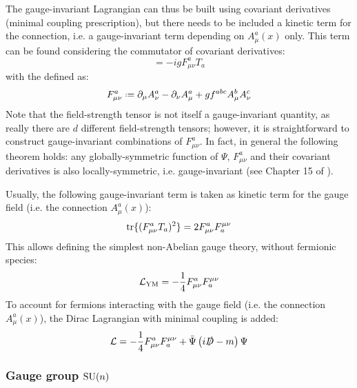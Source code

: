 The gauge-invariant Lagrangian can thus be built using covariant derivatives (minimal coupling prescription), but there needs to be included a kinetic term for the connection, i.e. a gauge-invariant term depending on $ A_\mu^a(x) $ only. This term can be found considering the commutator of covariant derivatives:
\begin{equation}
  [D_\mu , D_\nu] = - i g F_{\mu \nu}^a T_a
\end{equation}
with the  defined as:
\begin{equation}
  F_{\mu \nu}^a \defeq \pa_\mu A_\nu^a - \pa_\nu A_\mu^a + g f^{abc} A_\mu^b A_\nu^c
\end{equation}
Note that the field-strength tensor is not itself a gauge-invariant quantity, as really there are $ d $ different field-strength tensors; however, it is straightforward to construct gauge-invariant combinations of $ F_{\mu \nu}^a $. In fact, in general the following theorem holds: any globally-symmetric function of $ \Psi $, $ F_{\mu \nu}^a $ and their covariant derivatives is also locally-symmetric, i.e. gauge-invariant (see Chapter 15 of \cite{Peskin-1995}).

Usually, the following gauge-invariant term is taken as kinetic term for the gauge field (i.e. the connection $ A_\mu^a(x) $):
\begin{equation}
  \operatorname{tr} \{(F_{\mu \nu}^a T_a)^2\} = 2 F_{\mu \nu}^a F^{\mu \nu}_a
\end{equation}
This allows defining the simplest non-Abelian gauge theory,  without fermionic species:
\begin{equation}
  \mathcal{L}_\text{YM} = - \frac{1}{4} F_{\mu \nu}^a F^{\mu \nu}_a
\end{equation}
To account for fermions interacting with the gauge field (i.e. the connection $ A_\mu^a(x) $), the Dirac Lagrangian with minimal coupling is added:
\begin{equation}
  \mathcal{L} = - \frac{1}{4} F_{\mu \nu}^a F^{\mu \nu}_a + \bar{\Psi} \left( i \slashed{D} - m \right) \Psi
  \label{eq:qcd-lag}
\end{equation}

\subsubsection{Gauge group \texorpdfstring{$ \mathrm{SU}(n) $}{SU(n)}}

